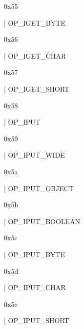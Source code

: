 \documentclass[11pt]{article}
\begin{document}
\begin{ocamldoccomment}
0x55
\end{ocamldoccomment}
\begin{ocamldoccode}
  | OP_IGET_BYTE
\end{ocamldoccode}
\begin{ocamldoccomment}
0x56
\end{ocamldoccomment}
\begin{ocamldoccode}
  | OP_IGET_CHAR
\end{ocamldoccode}
\begin{ocamldoccomment}
0x57
\end{ocamldoccomment}
\begin{ocamldoccode}
  | OP_IGET_SHORT
\end{ocamldoccode}
\begin{ocamldoccomment}
0x58
\end{ocamldoccomment}
\begin{ocamldoccode}
  | OP_IPUT
\end{ocamldoccode}
\begin{ocamldoccomment}
0x59
\end{ocamldoccomment}
\begin{ocamldoccode}
  | OP_IPUT_WIDE
\end{ocamldoccode}
\begin{ocamldoccomment}
0x5a
\end{ocamldoccomment}
\begin{ocamldoccode}
  | OP_IPUT_OBJECT
\end{ocamldoccode}
\begin{ocamldoccomment}
0x5b
\end{ocamldoccomment}
\begin{ocamldoccode}
  | OP_IPUT_BOOLEAN
\end{ocamldoccode}
\begin{ocamldoccomment}
0x5c
\end{ocamldoccomment}
\begin{ocamldoccode}
  | OP_IPUT_BYTE
\end{ocamldoccode}
\begin{ocamldoccomment}
0x5d
\end{ocamldoccomment}
\begin{ocamldoccode}
  | OP_IPUT_CHAR
\end{ocamldoccode}
\begin{ocamldoccomment}
0x5e
\end{ocamldoccomment}
\begin{ocamldoccode}
  | OP_IPUT_SHORT
\end{ocamldoccode}
\end{document}
